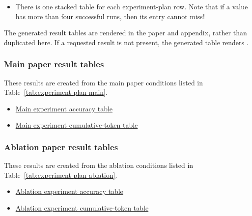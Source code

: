 \documentclass[11pt]{article}
\begin{document}
\begin{itemize}
\begin{itemize}
  \item Semantically Meaningful Numbers Explored shows the total number of semantically meaningful printed numeric values marked by the LLM.
  \item Successful Runs shows how many successful runs contributed to each visible cell.
  Under the five-repetition-seed visibility rule, visible cells contain five successful runs.
  This table should contain integers rather than std.
  \end{itemize}
  \item There is one stacked table for each experiment-plan row. Note that if a value has more than four successful runs, then its entry cannot miss!
\end{itemize}
   

The generated result tables are rendered in the paper and appendix, rather than duplicated here.
If a requested result is not present, the generated table renders \code{-}.

\subsubsection*{Main paper result tables}
These results are created from the main paper conditions listed in Table~\ref{tab:experiment-plan-main}.
\begin{itemize}
  \item \hyperref[tab:acc_main_experiment_table]{Main experiment accuracy table}
  \item \hyperref[tab:cum-main-experiment-table]{Main experiment cumulative-token table}
\end{itemize}

\subsubsection*{Ablation paper result tables}
These results are created from the ablation conditions listed in Table~\ref{tab:experiment-plan-ablation}.
\begin{itemize}
  \item \hyperref[tab:acc_ablation_training_examples]{Ablation experiment accuracy table}
  \item \hyperref[tab:cum-ablation-training-examples]{Ablation experiment cumulative-token table}
\end{itemize}
\end{document}
